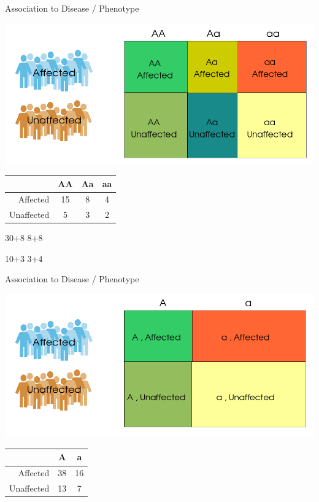\begin{frame}{Association to Disease / Phenotype}

\centerline{\includegraphics[scale=0.3]{images/asoc_table_3.png}}

\begin{longtable}[c]{@{}rccc@{}}
\toprule
~ & AA & Aa & aa\tabularnewline
\midrule
\endhead
Affected & 15 & 8 & 4\tabularnewline
Unaffected & 5 & 3 & 2\tabularnewline
\bottomrule
\end{longtable}

30+8 \textbar{} 8+8

10+3 \textbar{} 3+4

\end{frame}

\begin{frame}{Association to Disease / Phenotype}

\centerline{\includegraphics[scale=0.3]{images/asoc_table_2.png}}

\begin{longtable}[c]{@{}rcc@{}}
\toprule
~ & A & a\tabularnewline
\midrule
\endhead
Affected & 38 & 16\tabularnewline
Unaffected & 13 & 7\tabularnewline
\bottomrule
\end{longtable}

\end{frame}

